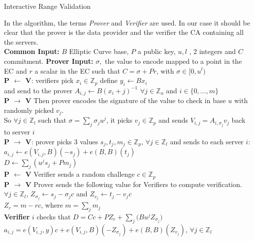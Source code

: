 \documentclass{article}
\begin{document}
\begin{algorithm}[H]
\caption{Interactive Range Validation}\label{euclid}
\begin{algorithmic}[1]

\State In the algorithm, the terms \textit{Prover} and \textit{Verifier} are used. In our case it should be clear that the prover is the data provider and the verifier the CA containing all the servers.\\
\State \textbf{Common Input:} $B$ Elliptic Curve base,  $P$ a public key, $ u, l$ , 2 integers and $C$ commitment.
\State \textbf{Prover Input:} 
$\sigma,$ the value to encode mapped to a point in the EC and $r$ a scalar in the EC such that $C = \sigma + Pr$, with $\sigma \in [0,u^l)$\\
\State  \textbf{P $\leftarrow$ V}: verifiers pick $x_i \in \mathbb{Z}_p$ define $y_i \gets Bx_i$\\
and send to the prover $A_{i,j} \gets B(x_i+j)^{-1}$ $ \forall j \in \mathbb{Z}_u$ and $ i \in \{0,...,m\}$\\
\State \textbf{P $\rightarrow$ V} Then prover encodes the signature of the value to check in base $u$ with randomly picked $v_j$.\\
So $\forall j \in \mathbb{Z}_l $ such that $ \sigma = \sum_{j}{\sigma_j u^j}$, it picks $v_j \in \mathbb{Z}_p$ and sends $V_{i,j} = A_{i,\sigma_j}v_j$ back to server $i$\\
\State \textbf{P $\rightarrow$ V}: prover picks 3 values $s_j,t_j,m_j \in \mathbb{Z}_p $, $\forall j \in \mathbb{Z}_l$ and sends to each server $i$:\\
$a_{i,j} \gets e(V_{i,j},B)(-s_j)+e(B,B)(t_j)$\\
$D \gets \sum_{j}{(u^j s_j + Pm_j)}$\\
\State \textbf{P $\leftarrow$ V} Verifier sends a random challenge $c \in \mathbb{Z}_p$\\
\State \textbf{P $\rightarrow$ V} Prover sends the following value for Verifiers to compute verification.\\
$ \forall j \in \mathbb{Z}_l$, $Z_{\sigma_j} \gets s_j-\sigma_j c$ and $Z_{v_j} \gets t_j-v_j c$\\
$Z_r = m -rc $, where $m = \sum_{j}{m_j}$\\
\State \textbf{Verifier} $i$ checks that $D = Cc + PZ_r + \sum_{j}{(Bu^j Z_{\sigma_j}}) $\\
$a_{i,j} = e(V_{i,j},y)c + e(V_{i,j},B)(-Z_{\sigma_j}) + e(B,B)(Z_{v_j})$, $\forall j \in \mathbb{Z}_l$
\end{algorithmic}
\end{algorithm}
\end{document}
